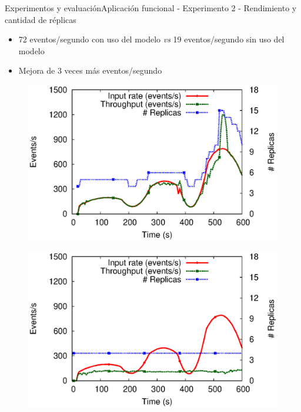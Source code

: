 \begin{frame}{Experimentos y evaluación}{Aplicación funcional - Experimento 2 - Rendimiento y cantidad de réplicas}

\begin{itemize}
\item 72 eventos/segundo con uso del modelo \textit{vs} 19 eventos/segundo sin uso del modelo
\item Mejora de 3 veces más eventos/segundo
\end{itemize}

\begin{multicols}{2}
\begin{figure}[p]
	\centering
	\includegraphics[scale=0.4]{images/exp/app1/dynamic/adaptative/exp2-processSystem.eps}
\end{figure}

\begin{figure}[p]
	\centering
	\includegraphics[scale=0.4]{images/exp/app1/dynamic/baseline/exp2-processSystem.eps}
\end{figure}
\end{multicols}
\end{frame}

